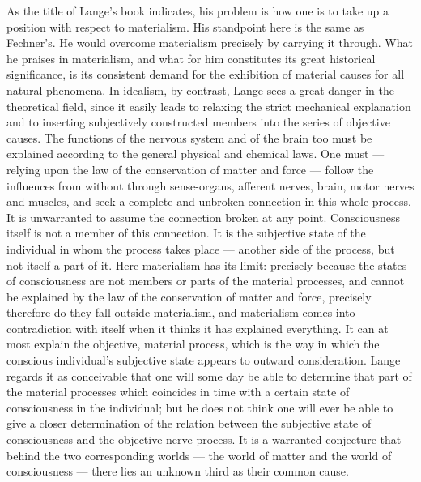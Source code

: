 \documentclass[12pt,a4paper]{book}
\newcommand{\opage}[1]{\marginnote{\footnotesize\textit{[#1]}}}
\begin{document}
As the title of Lange's book indicates, his problem is how one is to take up a
position with respect to materialism. His standpoint here is the same as
Fechner's. He would overcome materialism precisely by carrying it through. What
he praises in materialism, and what for him constitutes its great historical
significance, is its consistent demand for the \opage{547}exhibition of material causes for
all natural phenomena. In idealism, by contrast, Lange sees a great danger in the
theoretical field, since it easily leads to relaxing the strict mechanical
explanation and to inserting subjectively constructed members into the series of
objective causes. The functions of the nervous system and of the brain too must
be explained according to the general physical and chemical laws. One must ---
relying upon the law of the conservation of matter and force --- follow the
influences from without through sense-organs, afferent nerves, brain, motor
nerves and muscles, and seek a complete and unbroken connection in this whole
process. It is unwarranted to assume the connection broken at any point.
Consciousness itself is not a member of this connection. It is the subjective
state of the individual in whom the process takes place --- another side of the
process, but not itself a part of it. Here materialism has its limit: precisely
because the states of consciousness are not members or parts of the material
processes, and cannot be explained by the law of the conservation of matter and
force, precisely therefore do they fall outside materialism, and materialism
comes into contradiction with itself when it thinks it has explained everything.
It can at most explain the objective, material process, which is the way in which
the conscious individual's subjective state appears to outward consideration.
Lange regards it as conceivable that one will some day be able to determine that
part of the material processes which coincides in time with a certain state of
consciousness in the individual; but he does not think one will ever be able to
give a closer determination of the relation between the subjective state of
consciousness and the objective nerve process. It is a warranted conjecture that
behind the two corresponding worlds --- the world of matter and the world of
consciousness --- there lies an unknown third as their common cause.
\end{document}
